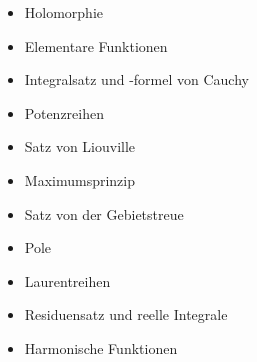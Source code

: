\begin{module}
\begin{learningoutcomes}
\end{learningoutcomes}

\begin{content}
\begin{itemize}\item Holomorphie  \item Elementare Funktionen  \item Integralsatz und -formel von Cauchy  \item Potenzreihen  \item Satz von Liouville  \item Maximumsprinzip  \item Satz von der Gebietstreue  \item Pole  \item Laurentreihen  \item Residuensatz und reelle Integrale  \item Harmonische Funktionen  \end{itemize}
\end{content}



\end{module}

